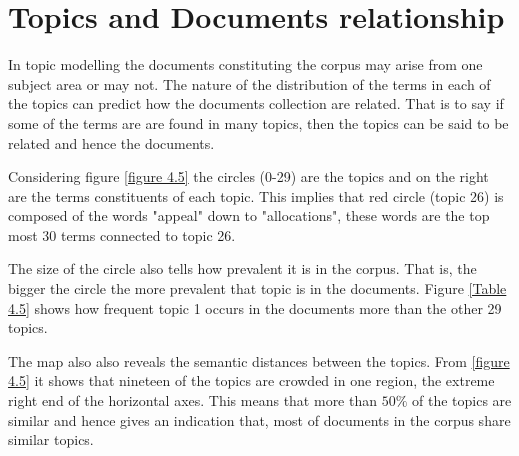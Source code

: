 \section{Topics and Documents relationship}
\begin{flushleft}
  In topic modelling the documents constituting the corpus may arise from one subject area or may not.
  The nature of the distribution of the terms in each of the topics can predict how the documents collection are related.
  That is to say if some of the terms are are found in many topics, then the topics can be said to be  related and hence the documents. 
\end{flushleft}
\begin{flushleft}
  Considering figure \eqref{figure 4.5} the circles (0-29) are the topics and on the right
  are the terms constituents of each topic. This implies that red circle (topic 26) is composed of the words "appeal" down to "allocations", these words are the top most 30 terms connected to topic 26.
\end{flushleft}
\begin{flushleft}
The size of the circle also tells how prevalent it is in the corpus. That is, the bigger the circle the more prevalent that topic is in the documents. Figure \eqref{Table 4.5} shows how frequent topic 1 occurs in the documents more than the other 29 topics.
\end{flushleft}
\begin{flushleft}
  The map  also also reveals the semantic distances between the topics. From \eqref{figure 4.5} it shows that nineteen of the topics are crowded in one region, the extreme  right end of the horizontal axes. This means that more than $50\%$ of the topics are similar and hence gives an indication that, most of documents in the corpus share similar topics.
\end{flushleft}
